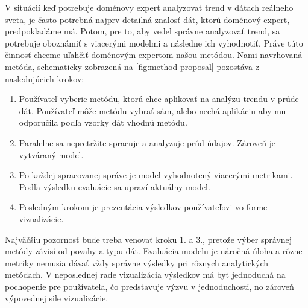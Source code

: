 V situácií keď potrebuje doménovy expert analyzovať trend v dátach reálneho sveta, je často potrebná najprv detailná znalosť dát, ktorú doménový expert, predpokladáme má. Potom, pre to, aby vedel správne analyzovať trend, sa potrebuje oboznámiť s viacerými modelmi a následne ich vyhodnotiť. Práve túto činnosť chceme uľahčiť doménovým expertom našou metódou. Nami navrhovaná metóda, schematicky zobrazená na \ref{fig:method-proposal} pozostáva z nasledujúcich krokov:
\begin{enumerate}
	\item Používateľ vyberie metódu, ktorú chce aplikovať na analýzu trendu v prúde dát. Používateľ môže metódu vybrať sám, alebo nechá aplikáciu aby mu odporučila podľa vzorky dát vhodnú metódu.
	\item Paralelne sa nepretržite spracuje a analyzuje prúd údajov. Zároveň je vytváraný model.
	\item Po každej spracovanej správe je model vyhodnotený viacerými metrikami. Podľa výsledku evaluácie sa upraví aktuálny model.
	\item Posledným krokom je prezentácia výsledkov používateľovi vo forme vizualizácie.
\end{enumerate}
\label{fig:method-proposal}

Najväčšiu pozornosť bude treba venovať kroku 1. a 3., pretože výber správnej metódy závisí od povahy a typu dát. Evaluácia modelu je náročná úloha a rôzne metriky nemusia dávať vždy správne výsledky pri rôznych analytických metódach. V neposlednej rade vizualizácia výsledkov má byť jednoduchá na pochopenie pre používateľa, čo predstavuje výzvu v jednoduchosti, no zároveň výpovednej sile vizualizácie.
